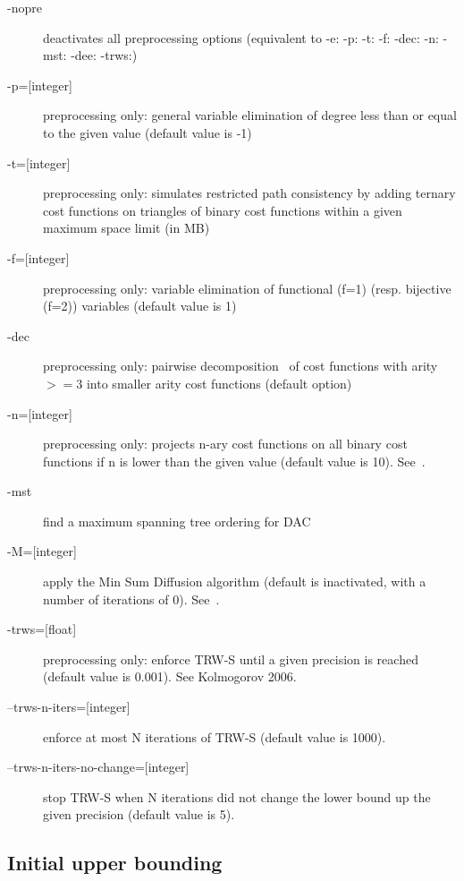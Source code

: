 \documentclass{article}
\begin{document}
\begin{description}
\item[{-nopre}] deactivates all preprocessing options (equivalent to -e:
  -p: -t: -f: -dec: -n: -mst: -dee: -trws:)
\item[{-p=[integer]}]preprocessing only: general variable elimination
  of degree less than or equal to the given value (default value is
  -1)
\item[{-t=[integer]}] preprocessing only: simulates restricted path
  consistency by adding ternary cost functions on triangles of binary
  cost functions within a given maximum space limit (in MB)
\item[{-f=[integer]}] preprocessing only: variable elimination of
  functional (f=1) (resp. bijective (f=2)) variables (default value is
  1)
\item[{-dec}] preprocessing only: pairwise decomposition~\cite{Favier11a} of cost
  functions with arity $>=3$ into smaller arity cost functions (default
  option)
\item[{-n=[integer]}] preprocessing only: projects n-ary cost functions
  on all binary cost functions if n is lower than the given value
  (default value is 10). See~\cite{Favier11a}.
\item[{-mst}] find a maximum spanning tree ordering for DAC
\item[{-M=[integer]}]
  apply the Min Sum Diffusion algorithm (default is inactivated, with
  a number of iterations of 0). See~\cite{Cooper10a}.
\item[{-trws=[float]}] 
  preprocessing only: enforce TRW-S until a given precision is reached (default value is 0.001). See Kolmogorov 2006.
\item[{--trws-n-iters=[integer]}] enforce at most N iterations of TRW-S (default value is 1000).
\item[{--trws-n-iters-no-change=[integer]}] stop TRW-S when N iterations did not change the lower bound up the given precision (default value is 5).
 \end{description}
 

\subsection{Initial upper bounding}
\end{document}
